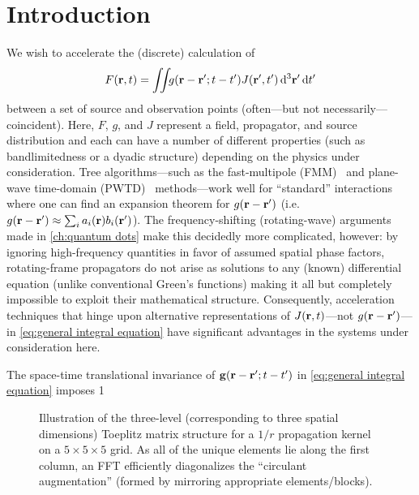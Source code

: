 \section{Introduction}

We wish to accelerate the (discrete) calculation of 
\begin{equation}
  F(\vb{r}, t) = \iint_{} g(\vb{r} - \vb{r}'; t - t') J(\vb{r}', t') \dd[3]{\vb{r}'} \dd{t'}
  \label{eq:general integral equation}
\end{equation}
between a set of source and observation points (often---but not necessarily---coincident).
Here, $F$, $g$, and $J$ represent a field, propagator, and source distribution and each can have a number of different properties (such as bandlimitedness or a dyadic structure) depending on the physics under consideration.
Tree algorithms---such as the fast-multipole (FMM)~\cite{Greengard1987} and plane-wave time-domain (PWTD)~\cite{Ergin1999} methods---work well for ``standard'' interactions where one can find an expansion theorem for $g(\vb{r} - \vb{r}')$ (i.e. $g(\vb{r} - \vb{r}') \approx \sum_i a_i(\vb{r}) b_i(\vb{r}')$).
The frequency-shifting (rotating-wave) arguments made in \cref{ch:quantum dots} make this decidedly more complicated, however: by ignoring high-frequency quantities in favor of assumed spatial phase factors, rotating-frame propagators do not arise as solutions to any (known) differential equation (unlike conventional Green's functions) making it all but completely impossible to exploit their mathematical structure.
Consequently, acceleration techniques that hinge upon alternative representations of $J(\vb{r}, t)$---not $g(\vb{r} - \vb{r}')$---in \cref{eq:general integral equation} have significant advantages in the systems under consideration here.

The space-time translational invariance of $\vb{g}(\vb{r} - \vb{r}'; t - t')$ in \cref{eq:general integral equation} imposes 1

\begin{figure}
  \centering
  \caption{\label{fig:toeplitz}Illustration of the three-level (corresponding to three spatial dimensions) Toeplitz matrix structure for a $1/r$ propagation kernel on a $5 \times 5 \times 5$ grid.
  As all of the unique elements lie along the first column, an FFT efficiently diagonalizes the ``circulant augmentation'' (formed by mirroring appropriate elements/blocks).}
\end{figure}
